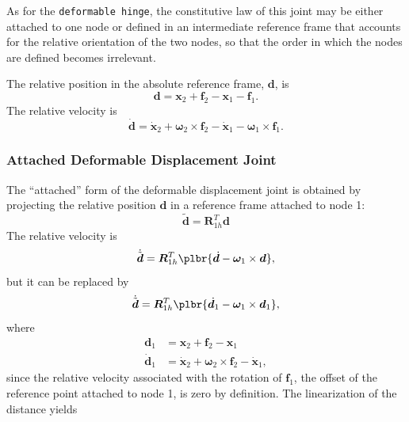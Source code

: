 \documentclass[10pt,fleqn,subeqn]{report}
\newcommand{\T}[1]{\bm{#1}}
\begin{document}
As for the \texttt{deformable hinge}, the constitutive law of this joint
may be either attached to one node or defined in an intermediate
reference frame that accounts for the relative orientation of the two nodes,
so that the order in which the nodes are defined becomes irrelevant.

The relative position in the absolute reference frame, $\T{d}$, is
\begin{equation}
	\T{d} = \T{x}_2 + \T{f}_2 - \T{x}_1 - \T{f}_1 .
\end{equation}
The relative velocity is
\begin{equation}
	\dot{\T{d}} = \dot{\T{x}}_2 + \T{\omega}_2 \times \T{f}_2
		- \dot{\T{x}}_1 - \T{\omega}_1 \times \T{f}_1 .
\end{equation}

\subsubsection{Attached Deformable Displacement Joint}
The ``attached'' form of the deformable displacement joint
is obtained by projecting the relative position $\T{d}$
in a reference frame attached to node 1:
\begin{equation}
	\tilde{\T{d}} = \T{R}_{1h}^T \T{d}
\end{equation}
The relative velocity is
\begin{equation}
	\dot{\tilde{\T{d}}} = \T{R}_{1h}^T\plbr{
		\dot{\T{d}} - \T{\omega}_1 \times \T{d}
	} ,
\end{equation}
but it can be replaced by
\begin{equation}
	\dot{\tilde{\T{d}}} = \T{R}_{1h}^T\plbr{
		\dot{\T{d}}_1 - \T{\omega}_1 \times \T{d}_1
	} ,
\end{equation}
where
\begin{subequations}
\begin{align}
	\T{d}_1 &= \T{x}_2 + \T{f}_2 - \T{x}_1 \\
	\dot{\T{d}}_1 &= \dot{\T{x}}_2 + \T{\omega}_2 \times \T{f}_2 - \dot{\T{x}}_1 ,
\end{align}
\end{subequations}
since the relative velocity associated with the rotation of $\T{f}_1$,
the offset of the reference point attached to node 1,
is zero by definition.
The linearization of the distance yields
\end{document}
